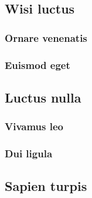 \subsection{Wisi luctus} \lipsum[15]
\subsubsection{Ornare venenatis} \lipsum[16]
\subsubsection{Euismod eget} \lipsum[17]
\subsection{Luctus nulla} \lipsum [18]
\subsubsection{Vivamus leo} \lipsum[19]
\subsubsection{Dui ligula} \lipsum[20]
\subsection{Sapien turpis} \lipsum [21-22]
